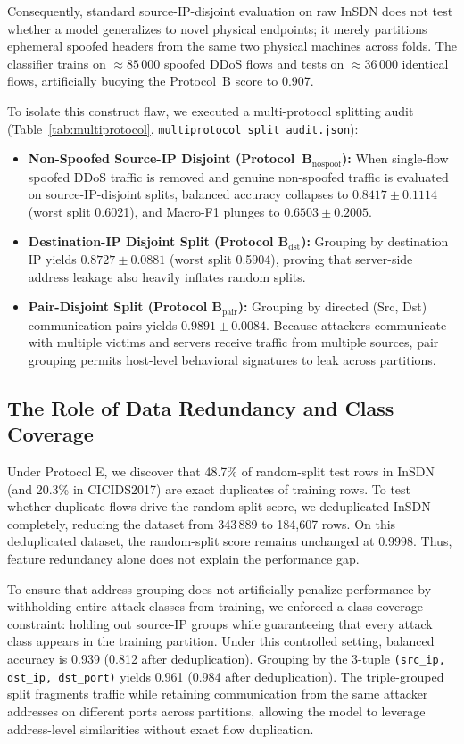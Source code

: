 \documentclass[journal]{IEEEtran}
\begin{document}
Consequently, standard source-IP-disjoint evaluation on raw InSDN does not test whether a model generalizes to novel physical endpoints; it merely partitions ephemeral spoofed headers from the same two physical machines across folds. The classifier trains on $\approx 85\,000$ spoofed DDoS flows and tests on $\approx 36\,000$ identical flows, artificially buoying the Protocol~B score to 0.907.

To isolate this construct flaw, we executed a multi-protocol splitting audit (Table~\ref{tab:multiprotocol}, \texttt{multiprotocol\_\allowbreak split\_\allowbreak audit\allowbreak .json}):
\begin{itemize}
    \item \textbf{Non-Spoofed Source-IP Disjoint (Protocol~B$_{\text{nospoof}}$):} When single-flow spoofed DDoS traffic is removed and genuine non-spoofed traffic is evaluated on source-IP-disjoint splits, balanced accuracy collapses to $0.8417\pm0.1114$ (worst split 0.6021), and Macro-F1 plunges to $0.6503\pm0.2005$.
    \item \textbf{Destination-IP Disjoint Split (Protocol B$_{\text{dst}}$):} Grouping by destination IP yields $0.8727\pm0.0881$ (worst split 0.5904), proving that server-side address leakage also heavily inflates random splits.
    \item \textbf{Pair-Disjoint Split (Protocol B$_{\text{pair}}$):} Grouping by directed (Src, Dst) communication pairs yields $0.9891\pm0.0084$. Because attackers communicate with multiple victims and servers receive traffic from multiple sources, pair grouping permits host-level behavioral signatures to leak across partitions.
\end{itemize}



\subsection{The Role of Data Redundancy and Class Coverage}
Under Protocol E, we discover that 48.7\% of random-split test rows in InSDN (and 20.3\% in CICIDS2017) are exact duplicates of training rows. To test whether duplicate flows drive the random-split score, we deduplicated InSDN completely, reducing the dataset from 343\,889 to 184,607 rows. On this deduplicated dataset, the random-split score remains unchanged at 0.9998. Thus, feature redundancy alone does not explain the performance gap.

To ensure that address grouping does not artificially penalize performance by withholding entire attack classes from training, we enforced a class-coverage constraint: holding out source-IP groups while guaranteeing that every attack class appears in the training partition. Under this controlled setting, balanced accuracy is 0.939 (0.812 after deduplication). Grouping by the 3-tuple \texttt{(src\_ip, dst\_ip, dst\_port)} yields 0.961 (0.984 after deduplication). The triple-grouped split fragments traffic while retaining communication from the same attacker addresses on different ports across partitions, allowing the model to leverage address-level similarities without exact flow duplication.
\end{document}
